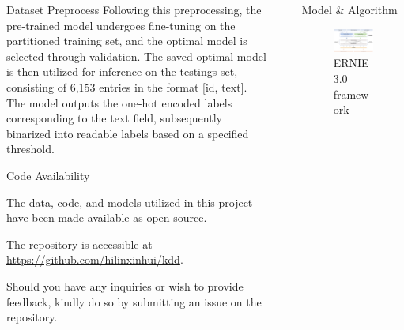 \documentclass[final]{beamer}
\newlength{\sepwidth}
\newlength{\colwidth}
\newcommand{\separatorcolumn}{\begin{column}{\sepwidth}\end{column}}
\begin{document}
\begin{frame}[t]
\begin{columns}[t]
\begin{column}{\colwidth}
\begin{block}{Dataset Preprocess}
Following this preprocessing, the pre-trained model undergoes fine-tuning on the partitioned training set, and the optimal model is selected through validation. The saved optimal model is then utilized for inference on the testings set, consisting of 6,153 entries in the format [id, text]. The model outputs the one-hot encoded labels corresponding to the text field, subsequently binarized into readable labels based on a specified threshold.


    

  \end{block}

     \begin{block}{Code Availability}

 The data, code, and models utilized in this project have been made available as open source. 
 
 The repository is accessible at \href{https://github.com/hilinxinhui/kdd}{https://github.com/hilinxinhui/kdd}. 
 
 Should you have any inquiries or wish to provide feedback, kindly do so by submitting an issue on the repository.


  \end{block}

\end{column}

\separatorcolumn

\begin{column}{\colwidth}

  

  \begin{block}{Model \& Algorithm}

    \begin{figure}
        \centering
        \includegraphics[width=1\textwidth]{logos/ernie-framework.png}
        \caption{ERNIE 3.0 framework}
        \label{fig: ERNIE 3.0 framework}
    \end{figure}


\end{block}
\end{column}
\end{columns}
\end{frame}
\end{document}
